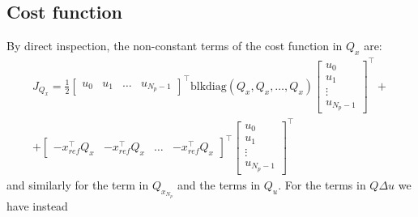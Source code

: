 \documentclass[a4paper,12pt,fleqn]{book}
\newcommand{\Np}{{N_p}}
\newcommand{\blkdiag}{\text{blkdiag}}
\begin{document}
\subsection{Cost function}
By direct inspection, the non-constant terms of the cost function in $Q_x$ are:
\begin{multline}
 J_{Q_x} = \frac{1}{2}
 \begin{bmatrix}
  u_0 & u_1 &\dots & u_{\Np-1}
 \end{bmatrix}^\top
 \blkdiag(Q_x, Q_x, \dots, Q_x)
 \begin{bmatrix}
  u_0 \\  u_1\\ \vdots\\  u_{\Np-1}
 \end{bmatrix}^\top
 + \\
 +
  \begin{bmatrix}
  -x_{ref}^\top Q_x & -x_{ref}^\top Q_x &\dots & -x_{ref}^\top Q_x
 \end{bmatrix}^\top 
 \begin{bmatrix}
  u_0 \\ u_1 \\ \vdots \\ u_{\Np-1}
 \end{bmatrix}^\top 
 \end{multline}
 and similarly for the term in $Q_{x_\Np}$ and the terms in $Q_u$. 
 For the terms in $Q \Delta u$ we have instead
\end{document}
